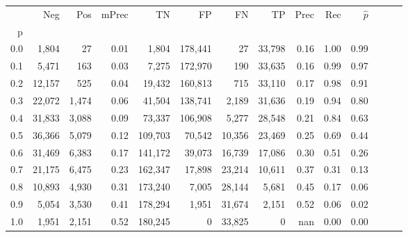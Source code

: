 \begin{tabular}{rrrrrrrrrrrrrr}
\toprule
{} &     Neg &    Pos & mPrec &       TN &       FP &      FN &      TP &  Prec &   Rec & $\hat{p}$ \\
p   &         &        &       &          &          &         &         &       &       &           \\
\midrule
0.0 &   1,804 &     27 &  0.01 &    1,804 &  178,441 &      27 &  33,798 &  0.16 &  1.00 &      0.99 \\
0.1 &   5,471 &    163 &  0.03 &    7,275 &  172,970 &     190 &  33,635 &  0.16 &  0.99 &      0.97 \\
0.2 &  12,157 &    525 &  0.04 &   19,432 &  160,813 &     715 &  33,110 &  0.17 &  0.98 &      0.91 \\
0.3 &  22,072 &  1,474 &  0.06 &   41,504 &  138,741 &   2,189 &  31,636 &  0.19 &  0.94 &      0.80 \\
0.4 &  31,833 &  3,088 &  0.09 &   73,337 &  106,908 &   5,277 &  28,548 &  0.21 &  0.84 &      0.63 \\
0.5 &  36,366 &  5,079 &  0.12 &  109,703 &   70,542 &  10,356 &  23,469 &  0.25 &  0.69 &      0.44 \\
0.6 &  31,469 &  6,383 &  0.17 &  141,172 &   39,073 &  16,739 &  17,086 &  0.30 &  0.51 &      0.26 \\
0.7 &  21,175 &  6,475 &  0.23 &  162,347 &   17,898 &  23,214 &  10,611 &  0.37 &  0.31 &      0.13 \\
0.8 &  10,893 &  4,930 &  0.31 &  173,240 &    7,005 &  28,144 &   5,681 &  0.45 &  0.17 &      0.06 \\
0.9 &   5,054 &  3,530 &  0.41 &  178,294 &    1,951 &  31,674 &   2,151 &  0.52 &  0.06 &      0.02 \\
1.0 &   1,951 &  2,151 &  0.52 &  180,245 &        0 &  33,825 &       0 &   nan &  0.00 &      0.00 \\
\bottomrule
\end{tabular}
